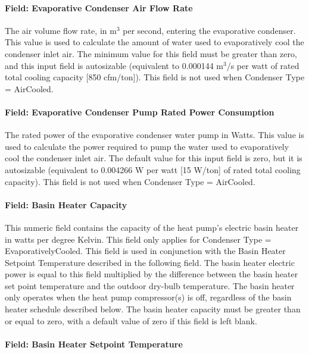 \paragraph{Field: Evaporative Condenser Air Flow Rate}\label{field-evaporative-condenser-air-flow-rate-000}

The air volume flow rate, in m\(^{3}\) per second, entering the evaporative condenser. This value is used to calculate the amount of water used to evaporatively cool the condenser inlet air. The minimum value for this field must be greater than zero, and this input field is autosizable (equivalent to 0.000144 m\(^{3}\)/s per watt of rated total cooling capacity {[}850 cfm/ton{]}). This field is not used when Condenser Type = AirCooled.

\paragraph{Field: Evaporative Condenser Pump Rated Power Consumption}\label{field-evaporative-condenser-pump-rated-power-consumption-000}

The rated power of the evaporative condenser water pump in Watts. This value is used to calculate the power required to pump the water used to evaporatively cool the condenser inlet air. The default value for this input field is zero, but it is autosizable (equivalent to 0.004266 W per watt {[}15 W/ton{]} of rated total cooling capacity). This field is not used when Condenser Type = AirCooled.

\paragraph{Field: Basin Heater Capacity}\label{field-basin-heater-capacity-001}

This numeric field contains the capacity of the heat pump's electric basin heater in watts per degree Kelvin. This field only applies for Condenser Type = EvaporativelyCooled. This field is used in conjunction with the Basin Heater Setpoint Temperature described in the following field. The basin heater electric power is equal to this field multiplied by the difference between the basin heater set point temperature and the outdoor dry-bulb temperature. The basin heater only operates when the heat pump compressor(s) is off, regardless of the basin heater schedule described below. The basin heater capacity must be greater than or equal to zero, with a default value of zero if this field is left blank.

\paragraph{Field: Basin Heater Setpoint Temperature}\label{field-basin-heater-setpoint-temperature-001}

